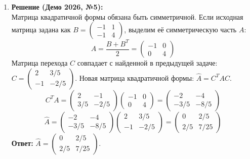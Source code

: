 \begin{enumerate}
    $$\hat{B} = \begin{pmatrix} 1 & -2 \\ 3/5 & -1 \end{pmatrix} \begin{pmatrix} 2 & 3/5 \\ -1 & -2/5 \end{pmatrix} = \begin{pmatrix} 4 & 7/5 \\ 11/5 & 19/25 \end{pmatrix}$$
    \textbf{Ответ:} $\hat{B} = \begin{pmatrix} 4 & 7/5 \\ 11/5 & 19/25 \end{pmatrix}$.

    \item \textbf{Решение (Демо 2026, №5):}\\
    Матрица квадратичной формы обязана быть симметричной. Если исходная матрица задана как $B = \begin{pmatrix} -1 & 1 \\ -1 & 4 \end{pmatrix}$, выделим её симметрическую часть $A$:
    $$A = \frac{B + B^T}{2} = \begin{pmatrix} -1 & 0 \\ 0 & 4 \end{pmatrix}$$
    Матрица перехода $C$ совпадает с найденной в предыдущей задаче: $C = \begin{pmatrix} 2 & 3/5 \\ -1 & -2/5 \end{pmatrix}$.
    Новая матрица квадратичной формы: $\hat{A} = C^T A C$.
    $$C^T A = \begin{pmatrix} 2 & -1 \\ 3/5 & -2/5 \end{pmatrix} \begin{pmatrix} -1 & 0 \\ 0 & 4 \end{pmatrix} = \begin{pmatrix} -2 & -4 \\ -3/5 & -8/5 \end{pmatrix}$$
    $$\hat{A} = \begin{pmatrix} -2 & -4 \\ -3/5 & -8/5 \end{pmatrix} \begin{pmatrix} 2 & 3/5 \\ -1 & -2/5 \end{pmatrix} = \begin{pmatrix} 0 & 2/5 \\ 2/5 & 7/25 \end{pmatrix}$$
    \textbf{Ответ:} $\hat{A} = \begin{pmatrix} 0 & 2/5 \\ 2/5 & 7/25 \end{pmatrix}$.


\end{enumerate}
